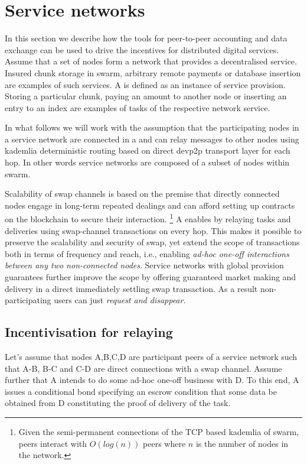 \section{Service networks}
\label{sec:networks}

In this section we describe how the tools for peer-to-peer accounting and data exchange can be used to drive the incentives for distributed digital services. Assume that a set of nodes form a network that provides a decentralised service. Insured chunk storage in swarm, arbitrary remote payments or database insertion are examples of such services. 
A  is defined as an instance of service provision. Storing a particular chunk, paying an amount to another node or inserting an entry to an index are examples of tasks of the respective network service.

In what follows we will work with the assumption that the participating nodes in a service network are connected in a  and can relay messages to other nodes using kademlia deterministic routing based on direct devp2p transport layer for each hop. In other words service networks are composed of a subset of nodes within swarm.

Scalability of swap channels is based on the premise that directly connected nodes engage in long-term repeated dealings and can afford setting up contracts on the blockchain to secure their interaction.%
%
\footnote{Given the semi-permanent connections of the TCP based kademlia of swarm, peers interact with $O(log(n))$ peers where $n$ is the number of nodes in the network.}
%
A  enables  by relaying tasks and deliveries using swap-channel transactions on every hop. This makes it possible to preserve the scalability and security of swap, yet extend the scope of transactions both in terms of frequency and reach, i.e., enabling \emph{ad-hoc one-off interactions between any two non-connected nodes}. 
Service networks with global provision guarantees further improve the scope by offering guaranteed market making and delivery in a direct immediately settling swap transaction. As a result non-participating users can just \emph{request and disappear}.

\subsection{Incentivisation for relaying}

Let's assume that nodes A,B,C,D are participant peers of a service network such that
A-B, B-C and C-D are direct connections with a swap channel.
Assume further that A intends to do some ad-hoc one-off business with D. To this end,  A issues a conditional bond specifying an escrow condition that some data be obtained from D constituting the proof of delivery of the task.

